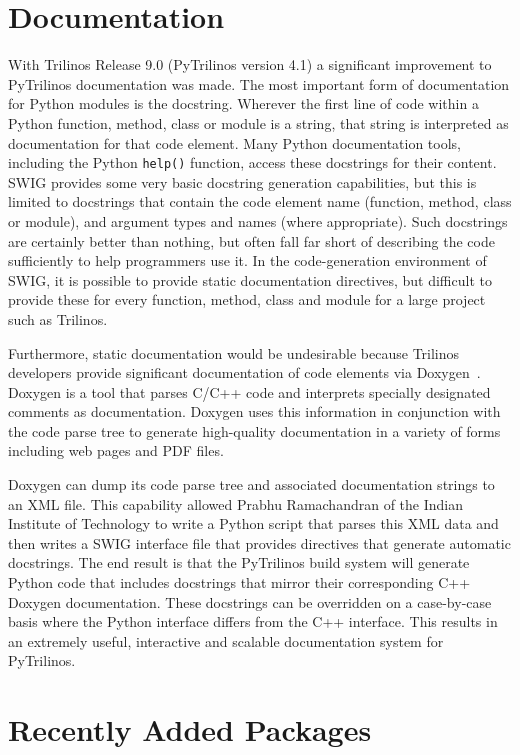 \documentclass[11pt]{article}
\begin{document}
\section{Documentation}
\label{sec:documentation}

With Trilinos Release 9.0 (PyTrilinos version 4.1) a significant improvement to PyTrilinos documentation was made.  The most important form of documentation for Python modules is the docstring.  Wherever the first line of code within a Python function, method, class or module is a string, that string is interpreted as documentation for that code element.  Many Python documentation tools, including the Python {\tt help()} function, access these docstrings for their content.  SWIG provides some very basic docstring generation capabilities, but this is limited to docstrings that contain the code element name (function, method, class or module), and argument types and names (where appropriate).  Such docstrings are certainly better than nothing, but often fall far short of describing the code sufficiently to help programmers use it.  In the code-generation environment of SWIG, it is possible to provide static documentation directives, but difficult to provide these for every function, method, class and module for a large project such as Trilinos.

Furthermore, static documentation would be undesirable because Trilinos developers provide significant documentation of code elements via Doxygen~\cite{Doxygen}.  Doxygen is a tool that parses C/C++ code and interprets specially designated comments as documentation.  Doxygen uses this information in conjunction with the code parse tree to generate high-quality documentation in a variety of forms including web pages and PDF files.

Doxygen can dump its code parse tree and associated documentation strings to an XML file.  This capability allowed Prabhu Ramachandran of the Indian Institute of Technology to write a Python script that parses this XML data and then writes a SWIG interface file that provides directives that generate automatic docstrings.  The end result is that the PyTrilinos build system will generate Python code that includes docstrings that mirror their corresponding C++ Doxygen documentation.  These docstrings can be overridden on a case-by-case basis where the Python interface differs from the C++ interface.  This results in an extremely useful, interactive and scalable documentation system for PyTrilinos.

\section{Recently Added Packages}
\label{sec:newpackages}
\end{document}
